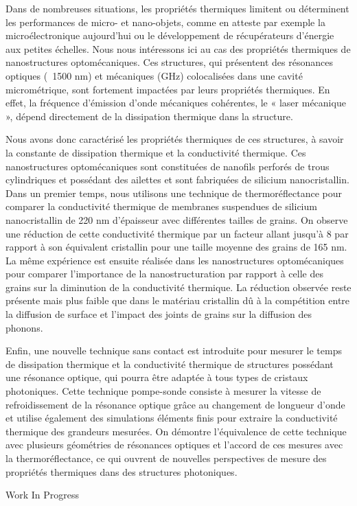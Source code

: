 {\normalsize
Dans de nombreuses situations, les propriétés thermiques limitent ou déterminent les performances de micro- et nano-objets, comme en atteste par exemple la microélectronique aujourd'hui ou le développement de récupérateurs d'énergie aux petites échelles. Nous nous intéressons ici au cas des propriétés thermiques de nanostructures optomécaniques. Ces structures, qui présentent des résonances optiques (~1500 nm) et mécaniques (GHz) colocalisées dans une cavité micrométrique, sont fortement impactées par leurs propriétés thermiques. En effet, la fréquence d'émission d'onde mécaniques cohérentes, le « laser mécanique », dépend directement de la dissipation thermique dans la structure.



 



Nous avons donc caractérisé les propriétés thermiques de ces structures, à savoir la constante de dissipation thermique et la conductivité thermique. Ces nanostructures optomécaniques sont constituées de nanofils perforés de trous cylindriques et possédant des ailettes et sont fabriquées de silicium nanocristallin. Dans un premier temps, nous utilisons une technique de thermoréflectance pour comparer la conductivité thermique de membranes suspendues de silicium nanocristallin de 220 nm d'épaisseur avec différentes tailles de grains. On observe une réduction de cette conductivité thermique par un facteur allant jusqu'à 8 par rapport à son équivalent cristallin pour une taille moyenne des grains de 165 nm. La même expérience est ensuite réalisée dans les nanostructures optomécaniques pour comparer l'importance de la nanostructuration par rapport à celle des grains sur la diminution de la conductivité thermique. La réduction observée reste présente mais plus faible que dans le matériau cristallin dû à la compétition entre la diffusion de surface et l'impact des joints de grains sur la diffusion des phonons.



 



Enfin, une nouvelle technique sans contact est introduite pour mesurer le temps de dissipation thermique et la conductivité thermique de structures possédant une résonance optique, qui pourra être adaptée à tous types de cristaux photoniques. Cette technique pompe-sonde consiste à mesurer la vitesse de refroidissement de la résonance optique grâce au changement de longueur d'onde et utilise également des simulations éléments finis pour extraire la conductivité thermique des grandeurs mesurées. On démontre l'équivalence de cette technique avec plusieurs géométries de résonances optiques et l'accord de ces mesures avec la thermoréflectance, ce qui ouvrent de nouvelles perspectives de mesure des propriétés thermiques dans des structures photoniques.

 \vfill Work In Progress

}
 
